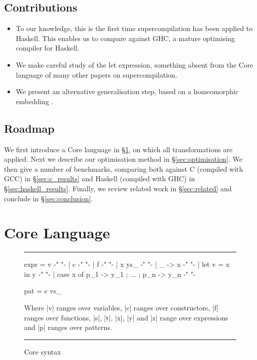 \documentclass{llncs}
\newenvironment{fig}
    {\begin{figure}[tbp]\hrule}
    {\end{figure}}
\newcommand{\figend}{\hrule}
\begin{document}
\subsection{Contributions}

\begin{itemize}
\item To our knowledge, this is the first time supercompilation has been applied to Haskell. This enables us to compare against GHC, a mature optimising compiler for Haskell.
\item We make careful study of the let expression, something absent from the Core language of many other papers on supercompilation.
\item We present an alternative generalisation step, based on a homeomorphic embedding \cite{leuschel:homeomorphic}.
\end{itemize}

\subsection{Roadmap}

We first introduce a Core language in \S\ref{sec:core}, on which all transformations are applied. Next we describe our optimisation method in \S\ref{sec:optimisation}. We then give a number of benchmarks, comparing both against C (compiled with GCC) in \S\ref{sec:c_results} and Haskell (compiled with GHC) in \S\ref{sec:haskell_results}. Finally, we review related work in \S\ref{sec:related} and conclude in \S\ref{sec:conclusion}.

\section{Core Language}
\label{sec:core}

\begin{fig}
\begin{code}
expr  =  v                                          {-"  "-}
      |  c                                          {-"  "-}
      |  f                                          {-"  "-}
      |  x ys_                                      {-"  "-}
      |  \vs_ -> x                                  {-"  "-}
      |  let v = x in y                             {-"  "-}
      |  case x of {p_1 -> y_1 ; ... ; p_n -> y_n}  {-"  "-}

pat   =  c vs_
\end{code}

Where |v| ranges over variables, |c| ranges over constructors, |f| ranges over functions, |s|, |t|, |x|, |y| and |z| range over expressions and |p| ranges over patterns.
\bigskip
\figend
\caption{Core syntax}
\label{fig:core}
\end{fig}
\end{document}
